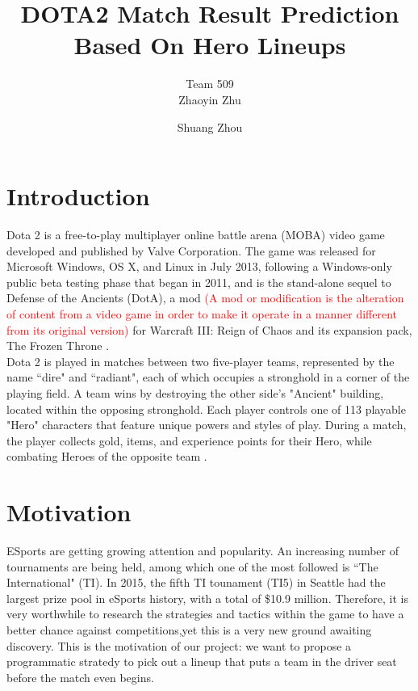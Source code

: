 \documentclass[11pt]{article}
\title{DOTA2 Match Result Prediction Based On Hero Lineups}
\author[1]{Team 509\\Zhaoyin Zhu}
\author[2]{Shuang Zhou}
\affil[1]{Division of Biostatistics, School of Medicine, New York University}
\affil[2]{Department of Computer Science, New York University}
\begin{document}
\maketitle

\section{Introduction}
Dota 2 is a free-to-play multiplayer online battle arena (MOBA) video game developed and published by Valve Corporation. The game was released for Microsoft Windows, OS X, and Linux in July 2013, following a Windows-only public beta testing phase that began in 2011, and is the stand-alone sequel to Defense of the Ancients (DotA), a mod \textcolor{red}{(A mod or modification is the alteration of content from a video game in order to make it operate in a manner different from its original version)} for Warcraft III: Reign of Chaos and its expansion pack, The Frozen Throne \cite{dota2}.\\

\noindent Dota 2 is played in matches between two five-player teams, represented by the name ``dire" and ``radiant", each of which occupies a stronghold in a corner of the playing field. A team wins by destroying the other side's "Ancient" building, located within the opposing stronghold. Each player controls one of 113 playable "Hero" characters that feature unique powers and styles of play. During a match, the player collects gold, items, and experience points for their Hero, while combating Heroes of the opposite team \cite{dota2}.

\section{Motivation}
ESports are getting growing attention and popularity. An increasing number of tournaments are being held, among which one of the most followed is ``The International" (TI). In 2015, the fifth TI tounament (TI5) in Seattle had the largest prize pool in eSports history, with a total of \$10.9 million\cite{ti5}. Therefore, it is very worthwhile to research the strategies and tactics within the game to have a better chance against competitions,yet this is a very new ground awaiting discovery. This is the motivation of our project: we want to propose a programmatic stratedy to pick out a lineup that puts a team in the driver seat before the match even begins.\\
\end{document}
